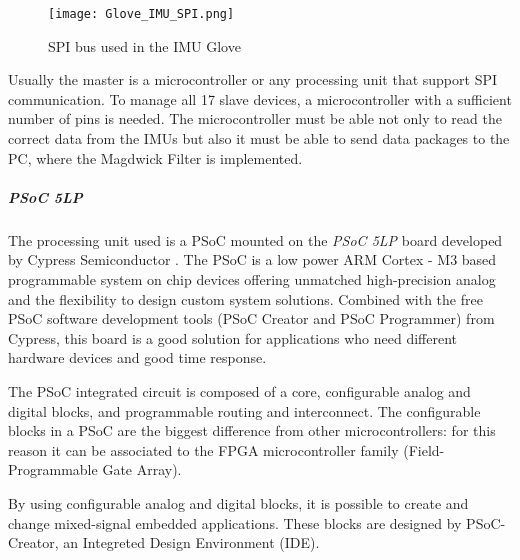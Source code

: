 \begin{figure}[h]
\centering
\texttt{[image: Glove\_IMU\_SPI.png]}
\caption{SPI bus used in the IMU Glove}
\label{fig:IMU_Glove_bus}
\end{figure}

Usually the master is a microcontroller  or any processing unit that support SPI communication. To manage all 17 slave devices,  a microcontroller with a sufficient number of pins is needed. The microcontroller must be able not only to read the correct data from the IMUs but also it must be able to send  data packages to the PC, where the Magdwick Filter is implemented.   \\
\newline

\subparagraph{PSoC 5LP}

The processing unit used is a PSoC mounted on the \textit{PSoC 5LP} board developed by Cypress Semiconductor \cite{PSOC5LP}. The PSoC is a low power ARM \textsuperscript \textregistered Cortex - M3 based programmable system on chip devices offering unmatched high-precision analog and the flexibility to design custom system solutions. Combined with the free PSoC software development tools (PSoC Creator and
PSoC Programmer) from Cypress, this board is a good solution for applications who need different hardware devices and good time response. %

The PSoC integrated circuit is composed of a core, configurable analog and digital blocks, and programmable routing and interconnect. The configurable blocks in a PSoC are the biggest difference from other microcontrollers: for this reason it can be associated to the FPGA microcontroller family (Field-Programmable Gate Array).

By using configurable analog and digital blocks, it is possible to  create and change mixed-signal embedded applications. These blocks are designed by PSoC-Creator, an Integreted Design Environment (IDE).

